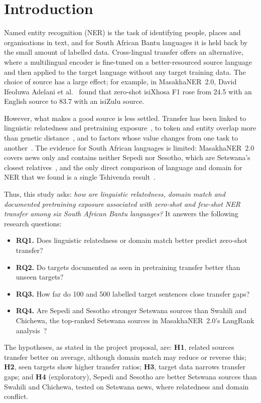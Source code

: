 \section{Introduction}\label{sec:intro}

Named entity recognition (NER) is the task of identifying people, places and organisations in text, and for South African Bantu languages it is held back by the small amount of labelled data. Cross-lingual transfer offers an alternative, where a multilingual encoder is fine-tuned on a better-resourced source language and then applied to the target language without any target training data. The choice of source has a large effect; for example, in MasakhaNER~2.0, David Ifeoluwa Adelani et al.~\cite{adelani2022} found that zero-shot isiXhosa F1 rose from 24.5 with an English source to 83.7 with an isiZulu source.

However, what makes a good source is less settled. Transfer has been linked to linguistic relatedness and pretraining exposure~\cite{devries2022,pires2019}, to token and entity overlap more than genetic distance~\cite{beukman2023,adelani2022}, and to factors whose value changes from one task to another~\cite{idris2026}. The evidence for South African languages is limited: MasakhaNER~2.0 covers news only and contains neither Sepedi nor Sesotho, which are Setswana's closest relatives~\cite{adelani2022}, and the only direct comparison of language and domain for NER that we found is a single Tshivenda result~\cite{mbuvha2023}.

Thus, this study asks: \emph{how are linguistic relatedness, domain match and documented pretraining exposure associated with zero-shot and few-shot NER transfer among six South African Bantu languages?} It answers the following research questions:
\begin{itemize}
  \item \textbf{RQ1.} Does linguistic relatedness or domain match better predict zero-shot transfer?
  \item \textbf{RQ2.} Do targets documented as seen in pretraining transfer better than unseen targets?
  \item \textbf{RQ3.} How far do 100 and 500 labelled target sentences close transfer gaps?
  \item \textbf{RQ4.} Are Sepedi and Sesotho stronger Setswana sources than Swahili and Chichewa, the top-ranked Setswana sources in MasakhaNER~2.0's LangRank analysis~\cite{lin2019,adelani2022}?
\end{itemize}
The hypotheses, as stated in the project proposal, are: \textbf{H1}, related sources transfer better on average, although domain match may reduce or reverse this; \textbf{H2}, seen targets show higher transfer ratios; \textbf{H3}, target data narrows transfer gaps; and \textbf{H4} (exploratory), Sepedi and Sesotho are better Setswana sources than Swahili and Chichewa, tested on Setswana news, where relatedness and domain conflict.

